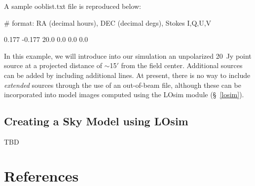 \documentclass[12pt,psfig]{article}
\begin{document}
A sample {\sf ooblist.txt} file is reproduced below:

\smallskip

\begin{flushleft}

\# format: RA (decimal hours), DEC (decimal degs), Stokes I,Q,U,V

0.177 -0.177 20.0 0.0 0.0 0.0

\end{flushleft}

\smallskip

\noindent In this example, we 
will introduce
into our simulation an unpolarized 
20~Jy point source  at a projected distance of $\sim$15$'$ from the field
center. Additional sources can be added by including additional lines.
At present, there is no way to include {\em extended} sources
through the use of an out-of-beam file, although these can be
incorporated into model images computed using the {\sf LOsim} module (\S~\ref{losim}). 

\subsection{Creating a Sky Model using LOsim\protect\label{losim}}
%
TBD
%

\section{References}
\end{document}
